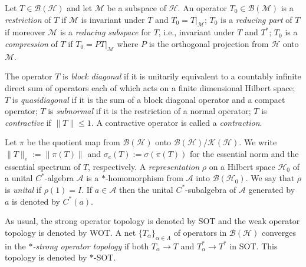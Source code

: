 \documentclass[11pt]{amsart}
\theoremstyle{definition}
\numberwithin{equation}{section}
\begin{document}
Let $T\in \mathcal{B(H)}$ and let $\mathcal{M}$ be a subspace of $\mathcal{H}$. An operator $T_{0}\in
\mathcal{B(M)}$ is a {\it restriction} of $T$ if $\mathcal{M}$ is invariant under $T$ and $T_{0}=T|_{\mathcal{M}}$; $T_{0}$ is a {\it reducing part} of $T$ if moreover
$\mathcal{M}$ is a {\it reducing subspace} for $T$, i.e., invariant under $T$ and $T^{*}$; $T_{0}$ is a {\it compression} of $T$ if $T_{0}=PT|_{\mathcal{M}}$ where $P$ is
the orthogonal projection from $\mathcal{H}$ onto $\mathcal{M}$.

The operator $T$ is {\it block diagonal} \cite{Halmos} if it is unitarily equivalent to a countably
infinite direct sum of operators each of which acts on a finite dimensional Hilbert space; $T$ is {\it quasidiagonal} \cite{Halmos} if it is the sum of a block diagonal
operator and a compact operator; $T$ is {\it subnormal} if it is the restriction of a normal operator; $T$ is {\it contractive} if $\|T\|\leq 1$. A contractive operator is
called a {\it contraction}.

Let $\pi$ be the quotient map from $\mathcal{B(H)}$ onto $\mathcal{B(H)}/\mathcal{K(H)}$. We write $\|T\|_{e}:=\|\pi(T)\|$ and $\sigma_{e}(T):=\sigma(\pi(T))$ for the
essential norm and the essential spectrum of $T$, respectively. A {\it representation} $\rho$ on a Hilbert space $\mathcal{H}_{0}$ of a unital $C^{*}$-algebra
$\mathcal{A}$ is a $*$-homomorphism from $\mathcal{A}$ into $\mathcal{B}(\mathcal{H}_{0})$. We say that $\rho$ is {\it unital} if $\rho(1)=I$. If $a\in\mathcal{A}$ then
the unital $C^{*}$-subalgebra of $\mathcal{A}$ generated by $a$ is denoted by $C^{*}(a)$.

As usual, the strong operator topology is denoted by SOT and the weak operator topology is denoted by WOT. A net $\{T_{\alpha}\}_{\alpha\in\Lambda}$ of operators in
$\mathcal{B(H)}$ converges in the {\it $*$-strong operator topology} if both $T_{\alpha}\to T$ and $T_{\alpha}^{*}\to T^{*}$ in SOT. This topology is denoted by
$*$-SOT.
\end{document}
